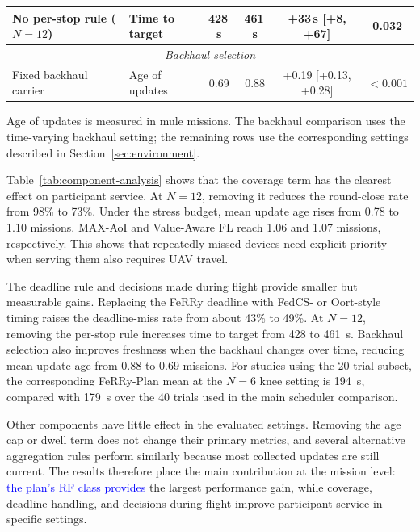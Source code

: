 \documentclass[conference]{IEEEtran}
\newcommand{\sysname}{FeRRy}
\begin{document}
\begin{table}[t]
\begin{tabular}{
p{}
p{}
c
c
c
c
}
No per-stop rule (\(N=12\)) &
Time to target &
428\,s & 461\,s &
+33\,s [+8, +67] &
0.032 \\

\hline
\multicolumn{6}{c}{\textit{Backhaul selection}} \\
\hline

Fixed backhaul carrier &
Age of updates &
0.69 & 0.88 &
+0.19 [+0.13, +0.28] &
$<0.001$ \\

\hline
\end{tabular}

\vspace{2pt}
\footnotesize
Age of updates is measured in mule missions. The backhaul comparison uses the
time-varying backhaul setting; the remaining rows use the corresponding
settings described in Section~\ref{sec:environment}.
\end{table}

Table~\ref{tab:component-analysis} shows that the coverage term has the clearest
effect on participant service. At \(N=12\), removing it reduces the round-close
rate from 98\% to 73\%. Under the stress budget, mean update age rises from
0.78 to 1.10 missions. MAX-AoI and Value-Aware FL reach 1.06 and 1.07 missions,
respectively. This shows that repeatedly missed devices need explicit priority
when serving them also requires UAV travel.

The deadline rule and decisions made during flight provide smaller but
measurable gains. Replacing the FeRRy deadline with FedCS- or Oort-style timing
raises the deadline-miss rate from about 43\% to 49\%. At \(N=12\), removing
the per-stop rule increases time to target from 428 to 461~s. Backhaul selection
also improves freshness when the backhaul changes over time, reducing mean
update age from 0.88 to 0.69 missions.
For studies using the 20-trial subset, the corresponding
\sysname{}-Plan mean at the \(N=6\) knee setting is 194~s, compared with
179~s over the 40 trials used in the main scheduler comparison.

Other components have little effect in the evaluated settings. Removing the age
cap or dwell term does not change their primary metrics, and several alternative
aggregation rules perform similarly because most collected updates are still
current. The results therefore place the main contribution at the mission level:
\textcolor{blue}{the plan's RF class provides} the largest performance gain, while coverage,
deadline handling, and decisions during flight improve participant service in
specific settings.
\end{document}
